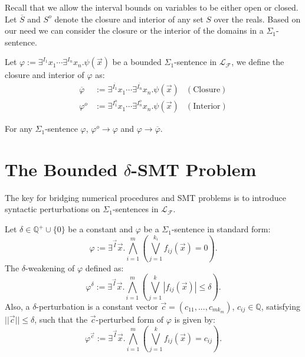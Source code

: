 \documentclass[envcountsect]{llncs}
\begin{document}
Recall that we allow the interval bounds on variables to be either open or closed. Let $\overline{S}$ and $S^o$ denote the closure and interior of any set $S$ over the reals. Based on our need we can consider the closure or the interior of the domains in a $\Sigma_1$-sentence. 
\begin{definition}
Let $\varphi:= \exists^{I_1}x_1\cdots\exists^{I_n}x_n. \psi(\vec x)$ be a bounded $\Sigma_1$-sentence in $\mathcal{L}_{\mathcal{F}}$, we define the closure and interior of $\varphi$ as:
\begin{align*}
\overline{\varphi} &:= \exists^{\overline{I_1}} x_1\cdots\exists^{\overline{I_n}}x_n. \psi(\vec x) &\mathrm{(Closure)}\\
{\varphi}^o &:= \exists^{I_1^o} x_1\cdots\exists^{I_n^o}x_n. \psi(\vec x) &\mathrm{(Interior)}
\end{align*}
\end{definition}
\begin{proposition}
For any $\Sigma_1$-sentence $\varphi$, $\varphi^o\rightarrow \varphi$ and $\varphi\rightarrow \overline{\varphi}$.
\end{proposition}
\section{The Bounded $\delta$-SMT Problem}\label{delta}
The key for bridging numerical procedures and SMT problems is to introduce syntactic perturbations on $\Sigma_1$-sentences in $\mathcal{L}_{\mathcal{F}}$. 

\begin{definition}\label{weak-def}
Let $\delta\in \mathbb{Q}^+\cup\{0\}$ be a constant and $\varphi$ be a $\Sigma_1$-sentence in standard form:
\[\varphi:= \exists^{\vec I}\vec x.\bigwedge_{i=1}^m (\bigvee_{j=1}^{k_i} f_{ij}(\vec x)= 0).
\]
The $\delta$-weakening of $\varphi$ defined as:
\[\varphi^{\delta}:= \exists^{\vec I} \vec x.\bigwedge_{i=1}^m(\bigvee_{j=1}^k |f_{ij}(\vec x)|\leq \delta).\]
Also, a $\delta$-perturbation is a constant vector $\vec c = (c_{11},...,c_{mk_m})$, $c_{ij}\in\mathbb{Q}$, satisfying $||\vec c||\leq\delta$, such that the $\vec c$-perturbed form of $\varphi$ is given by:
\[\varphi^{\vec c}:= \exists^{\vec I} \vec x.\bigwedge_{i=1}^m(\bigvee_{j=1}^k f_{ij}(\vec x) = c_{ij}).\]
\end{definition}
\end{document}
